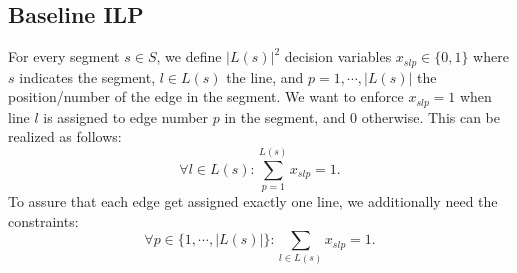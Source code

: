 \documentclass{llncs}
\begin{document}
%
\subsection{Baseline ILP}\label{SEC:baseline}
%
For every segment $s \in S$, we define $|L(s)|^{2}$ decision variables $x_{slp} \in \{0,1\}$ where $s$ indicates the segment, $l \in L(s)$ the line, and $p=1, \cdots, |L(s)|$ the position/number of the edge in the segment. We want to enforce $x_{slp}=1$ when line $l$ is assigned to edge number $p$ in the segment, and $0$ otherwise. This can be realized as follows:
\begin{equation*}
\forall l \in L(s): \sum_{p=1}^{L(s)} x_{slp}=1.
\end{equation*}
To assure that each edge get assigned exactly one line, we additionally need the constraints:
\begin{equation*}
	\forall p \in  \{1,\cdots,|L(s)|\} : \sum_{l \in L(s)} x_{slp} = 1.
\end{equation*}
\end{document}
